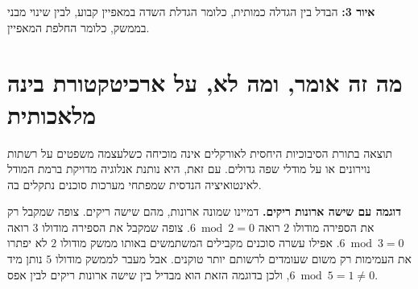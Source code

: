 \documentclass[11pt,a4paper]{article}
\newcommand{\PP}{\mathsf P}
\newcommand{\FF}{\mathbb F}
\newcommand{\LA}{\mathcal{L}_A}
\newcommand{\hc}[2]{\begin{minipage}{#1}\begin{RTL}\centering #2\end{RTL}\end{minipage}}
\newcommand{\figcap}[2]{\par\smallskip\noindent\textbf{איור #1:} #2\par}
\begin{document}
\begin{center}
\begin{LTR}
\end{LTR}
\end{center}
\figcap{3}{הבדל בין הגדלה כמותית, כלומר הגדלת השדה במאפיין קבוע, לבין שינוי מבני בממשק, כלומר החלפת המאפיין.}

\section{מה זה אומר, ומה לא, על ארכיטקטורת בינה מלאכותית}
תוצאה בתורת הסיבוכיות היחסית לאורקלים אינה מוכיחה כשלעצמה משפטים על רשתות נוירונים או על מודלי שפה גדולים. עם זאת, היא נותנת אנלוגיה מדויקת ברמת המודל לאינטואיציה הנדסית שמפתחי מערכות סוכנים נתקלים בה.

\medskip
\noindent\textbf{דוגמה עם שישה ארונות ריקים.}
דמיינו שמונה ארונות, מהם שישה ריקים. צופה שמקבל רק את הספירה מודולו $2$ רואה $6\bmod 2=0$. צופה שמקבל את הספירה מודולו $3$ רואה $6\bmod 3=0$. אפילו עשרה סוכנים מקבילים המשתמשים באותו ממשק מודולו $2$ לא יפתרו את העמימות רק משום שעומדים לרשותם יותר טוקנים. אבל מעבר לממשק מודולו $5$ נותן מיד $6\bmod 5=1\ne0$, ולכן בדוגמה הזאת הוא מבדיל בין שישה ארונות ריקים לבין אפס.
\end{document}
